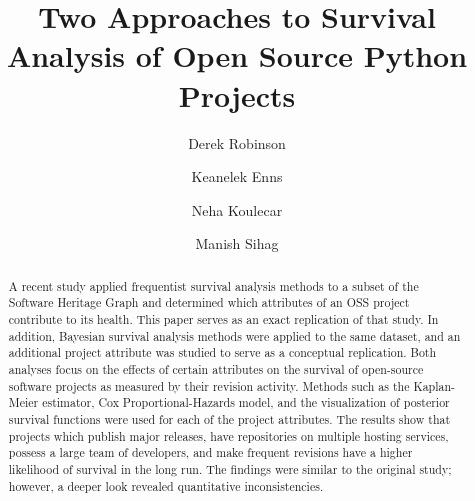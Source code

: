 \documentclass[sigconf]{acmart}
\begin{document}
\graphicspath{ {./img/} }


\title[Survival Analysis of Open Source Projects]{Two Approaches to Survival Analysis of Open Source Python Projects}

\author{Derek Robinson}

\author{Keanelek Enns}

\author{Neha Koulecar}

\author{Manish Sihag}
\renewcommand{\shortauthors}{D. Robinson, K. Enns, N. Koulecar, M. Sihag}

\begin{abstract}
    A recent study applied frequentist survival analysis methods to a subset of the Software Heritage Graph and determined which attributes of an OSS project contribute to its health. 
    This paper serves as an exact replication of that study. 
    In addition, Bayesian survival analysis methods were applied to the same dataset, and an additional project attribute was studied to serve as a conceptual replication.
    Both analyses focus on the effects of certain attributes on the survival of open-source software projects as measured by their revision activity.
    Methods such as the Kaplan-Meier estimator, Cox Proportional-Hazards model, and the visualization of posterior survival functions were used for each of the project attributes.
    The results show that projects which publish major releases, have repositories on multiple hosting services, possess a large team of developers, and make frequent revisions have a higher likelihood of survival in the long run.
    The findings were similar to the original study; however, a deeper look revealed quantitative inconsistencies.
\end{abstract}
\end{document}
